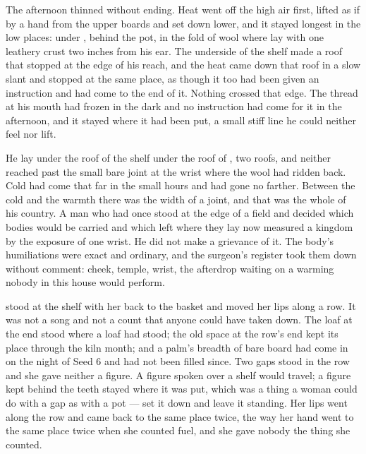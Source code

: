 The afternoon thinned without ending. Heat went off the high air first, lifted as if by a hand from the upper boards and set down lower, and it stayed longest in the low places: under , behind the pot, in the fold of wool where  lay with one leathery crust two inches from his ear. The underside of the shelf made a roof that stopped at the edge of his reach, and the heat came down that roof in a slow slant and stopped at the same place, as though it too had been given an instruction and had come to the end of it. Nothing crossed that edge. The thread at his mouth had frozen in the dark and no instruction had come for it in the afternoon, and it stayed where it had been put, a small stiff line he could neither feel nor lift.

He lay under the roof of the shelf under the roof of , two roofs, and neither reached past the small bare joint at the wrist where the wool had ridden back. Cold had come that far in the small hours and had gone no farther. Between the cold and the warmth there was the width of a joint, and that was the whole of his country. A man who had once stood at the edge of a field and decided which bodies would be carried and which left where they lay now measured a kingdom by the exposure of one wrist. He did not make a grievance of it. The body's humiliations were exact and ordinary, and the surgeon's register took them down without comment: cheek, temple, wrist, the afterdrop waiting on a warming nobody in this house would perform.

 stood at the shelf with her back to the basket and moved her lips along a row. It was not a song and not a count that anyone could have taken down. The loaf at the end stood where a loaf had stood; the old space at the row's end kept its place through the kiln month; and a palm's breadth of bare board had come in on the night of Seed 6 and had not been filled since. Two gaps stood in the row and she gave neither a figure. A figure spoken over a shelf would travel; a figure kept behind the teeth stayed where it was put, which was a thing a woman could do with a gap as with a pot --- set it down and leave it standing. Her lips went along the row and came back to the same place twice, the way her hand went to the same place twice when she counted fuel, and she gave nobody the thing she counted.

